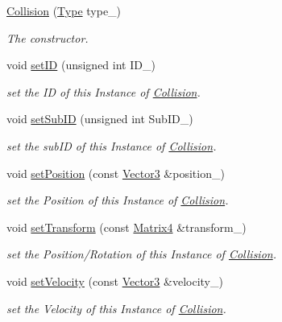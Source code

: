 \begin{DoxyCompactItemize}
\item 
\hyperlink{class_magnum_1_1_collision_a46268d910c83ef44fea79b8b72e8de66}{Collision} (\hyperlink{class_magnum_1_1_collision_af96418629e7663358a39f8138bc412a7}{Type} type\+\_\+)
\begin{DoxyCompactList}\small\item\em The constructor. \end{DoxyCompactList}\item 
void \hyperlink{class_magnum_1_1_collision_a499d69586c47a68a1861af057695a30b}{set\+ID} (unsigned int I\+D\+\_\+)
\begin{DoxyCompactList}\small\item\em set the ID of this Instance of \hyperlink{class_magnum_1_1_collision}{Collision}. \end{DoxyCompactList}\item 
void \hyperlink{class_magnum_1_1_collision_aeae38467d08b59027dd277ca6923fb2c}{set\+Sub\+ID} (unsigned int Sub\+I\+D\+\_\+)
\begin{DoxyCompactList}\small\item\em set the sub\+ID of this Instance of \hyperlink{class_magnum_1_1_collision}{Collision}. \end{DoxyCompactList}\item 
void \hyperlink{class_magnum_1_1_collision_a8b7a7fb7066629e41fdc8c72a009b94f}{set\+Position} (const \hyperlink{class_magnum_1_1_vector3}{Vector3} \&position\+\_\+)
\begin{DoxyCompactList}\small\item\em set the Position of this Instance of \hyperlink{class_magnum_1_1_collision}{Collision}. \end{DoxyCompactList}\item 
void \hyperlink{class_magnum_1_1_collision_ac7719f4d3e922b0234889d58987d5542}{set\+Transform} (const \hyperlink{class_magnum_1_1_matrix4}{Matrix4} \&transform\+\_\+)
\begin{DoxyCompactList}\small\item\em set the Position/\+Rotation of this Instance of \hyperlink{class_magnum_1_1_collision}{Collision}. \end{DoxyCompactList}\item 
void \hyperlink{class_magnum_1_1_collision_aee897f30094e0aceba97002de014057e}{set\+Velocity} (const \hyperlink{class_magnum_1_1_vector3}{Vector3} \&velocity\+\_\+)
\begin{DoxyCompactList}\small\item\em set the Velocity of this Instance of \hyperlink{class_magnum_1_1_collision}{Collision}. \end{DoxyCompactList}\item 

\end{DoxyCompactItemize}
